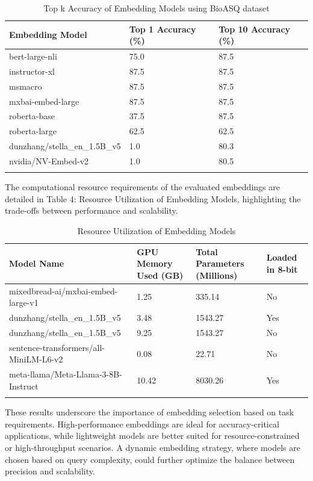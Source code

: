\documentclass[pdflatex,sn-mathphys-num]{sn-jnl}%
\begin{document}
\begin{table}[h]
\caption{Top k Accuracy of Embedding Models using BioASQ dataset}\label{tab:embedding_model_accuracy}%
\begin{tabular}{@{}p{}p{}p{}@{}}
\toprule
\textbf{Embedding Model} & \textbf{Top 1 Accuracy (\%)} & \textbf{Top 10 Accuracy (\%)} \\
\midrule
bert-large-nli & 75.0 & 87.5 \\
instructor-xl & 87.5 & 87.5 \\
msmacro & 87.5 & 87.5 \\
mxbai-embed-large & 87.5 & 87.5 \\
roberta-base & 37.5 & 87.5 \\
roberta-large & 62.5 & 62.5 \\
dunzhang/stella\_en\_1.5B\_v5 & 1.0 & 80.3 \\
nvidia/NV-Embed-v2 & 1.0 & 80.5 \\
\botrule
\end{tabular}
\end{table}

The computational resource requirements of the evaluated embeddings are detailed in Table 4: Resource Utilization of Embedding Models, highlighting the trade-offs between performance and scalability.

\begin{table}[h]
\caption{Resource Utilization of Embedding Models}\label{tab:model_comparison}%
\begin{tabular}{@{}p{}p{}p{}p{}@{}}
\toprule
\textbf{Model Name} & \textbf{GPU Memory Used (GB)} & \textbf{Total Parameters (Millions)} & \textbf{Loaded in 8-bit} \\
\midrule
mixedbread-ai/mxbai-embed-large-v1 & 1.25 & 335.14 & No \\
dunzhang/stella\_en\_1.5B\_v5 & 3.48 & 1543.27 & Yes \\
dunzhang/stella\_en\_1.5B\_v5 & 9.25 & 1543.27 & No \\
sentence-transformers/all-MiniLM-L6-v2 & 0.08 & 22.71 & No \\
meta-llama/Meta-Llama-3-8B-Instruct & 10.42 & 8030.26 & Yes \\
\botrule
\end{tabular}
\end{table}

These results underscore the importance of embedding selection based on task requirements. High-performance embeddings are ideal for accuracy-critical applications, while lightweight models are better suited for resource-constrained or high-throughput scenarios. A dynamic embedding strategy, where models are chosen based on query complexity, could further optimize the balance between precision and scalability.
\end{document}
